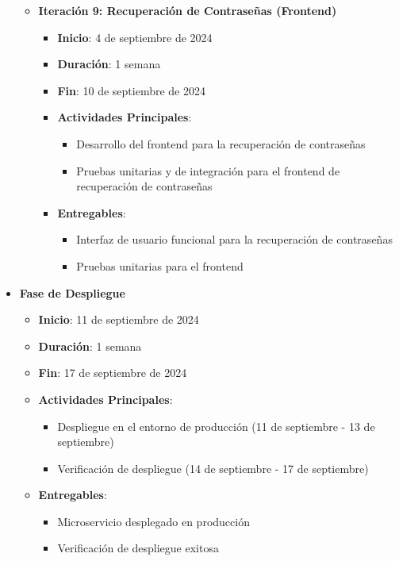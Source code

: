 \documentclass{article}
\begin{document}
\begin{itemize}
\begin{itemize}
              \item \textbf{Iteración 9: Recuperación de Contraseñas (Frontend)}
                    \begin{itemize}
                        \item \textbf{Inicio}: 4 de septiembre de 2024
                        \item \textbf{Duración}: 1 semana
                        \item \textbf{Fin}: 10 de septiembre de 2024
                        \item \textbf{Actividades Principales}:
                              \begin{itemize}
                                  \item Desarrollo del frontend para la recuperación de contraseñas
                                  \item Pruebas unitarias y de integración para el frontend de recuperación de contraseñas
                              \end{itemize}
                        \item \textbf{Entregables}:
                              \begin{itemize}
                                  \item Interfaz de usuario funcional para la recuperación de contraseñas
                                  \item Pruebas unitarias para el frontend
                              \end{itemize}
                    \end{itemize}
          \end{itemize}

    \item \textbf{Fase de Despliegue}
          \begin{itemize}
              \item \textbf{Inicio}: 11 de septiembre de 2024
              \item \textbf{Duración}: 1 semana
              \item \textbf{Fin}: 17 de septiembre de 2024
              \item \textbf{Actividades Principales}:
                    \begin{itemize}
                        \item Despliegue en el entorno de producción (11 de septiembre - 13 de septiembre)
                        \item Verificación de despliegue (14 de septiembre - 17 de septiembre)
                    \end{itemize}
              \item \textbf{Entregables}:
                    \begin{itemize}
                        \item Microservicio desplegado en producción
                        \item Verificación de despliegue exitosa
                    \end{itemize}
          \end{itemize}
\end{itemize}
\newpage
\end{document}
